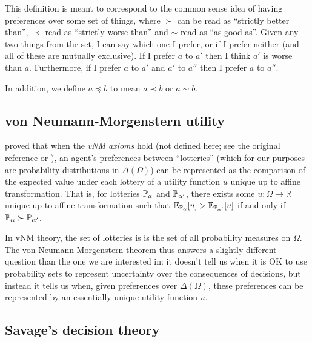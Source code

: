 This definition is meant to correspond to the common sense idea of having preferences over some set of things, where $\succ$ can be read as ``strictly better than'', $\prec$ read as ``strictly worse than'' and $\sim$ read as ``as good as''. Given any two things from the set, I can say which one I prefer, or if I prefer neither (and all of these are mutually exclusive). If I prefer $a$ to $a'$ then I think $a'$ is worse than $a$. Furthermore, if I prefer $a$ to $a'$ and $a'$ to $a''$ then I prefer $a$ to $a''$.

In addition, we define $a\preceq b$ to mean $a\prec b$ or $a \sim b$.

\subsection{von Neumann-Morgenstern utility}

\citet{von_neumann_theory_1944} proved that when the \emph{vNM axioms} hold (not defined here; see the original reference or \citet{steele_decision_2020}), an agent's preferences between ``lotteries'' (which for our purposes are probability distributions in $\Delta(\Omega)$) can be represented as the comparison of the expected value under each lottery of a utility function $u$ unique up to affine transformation. That is, for lotteries $\mathbb{P}_\alpha$ and $\mathbb{P}_{\alpha'}$, there exists some $u:\Omega\to \mathbb{R}$ unique up to affine transformation such that $\mathbb{E}_{\mathbb{P}_\alpha}[u]> \mathbb{E}_{\mathbb{P}_{\alpha'}}[u]$ if and only if $\mathbb{P}_{\alpha} \succ \mathbb{P}_{\alpha'}$.

In vNM theory, the set of lotteries is is the set of all probability measures on $\Omega$. The von Neumann-Morgenstern theorem thus answers a slightly different question than the one we are interested in: it doesn't tell us when it is OK to use probability sets to represent uncertainty over the consequences of decisions, but instead it tells us when, given preferences over $\Delta(\Omega)$, these preferences can be represented by an essentially unique utility function $u$.

\subsection{Savage's decision theory}

